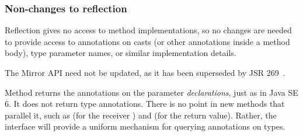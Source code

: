 \documentclass[10pt]{article}
\begin{document}
% 
% 
% 
% 



\subsubsection{Non-changes to reflection\label{non-changes-to-reflection}}

Reflection gives no access to method implementations, so no changes are
needed to
provide access to annotations on casts (or other annotations inside
a method body), type parameter names, or similar implementation details.


The Mirror API  need not be updated, as it has been
superseded by JSR 269~\cite{JSR269}.


Method  returns the annotations on
the parameter \emph{declarations}, just as in Java SE 6.  It does not return
type annotations.  There is no point in new methods that parallel it,
such as  (for the receiver
) and  (for the return
value).  Rather, the interface will provide a uniform mechanism for
querying annotations on types.
\end{document}
